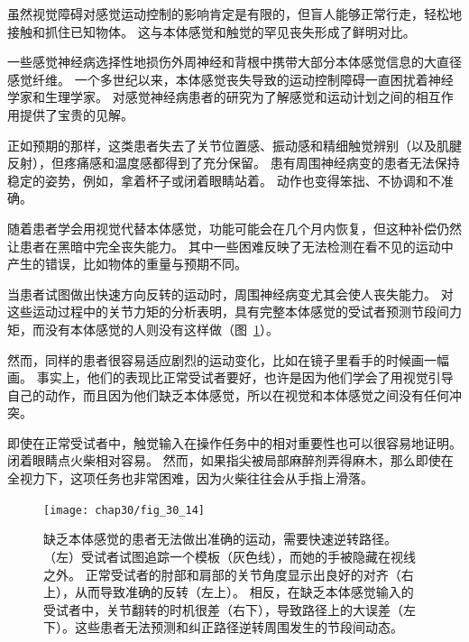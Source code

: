 \begin{proposition}[本体感觉和触觉对感觉运动控制至关重要] \label{box:30_3}
	
	\quad \quad 虽然视觉障碍对感觉运动控制的影响肯定是有限的，但盲人能够正常行走，轻松地接触和抓住已知物体。
	这与本体感觉和触觉的罕见丧失形成了鲜明对比。
	
	\quad \quad 一些感觉神经病选择性地损伤外周神经和背根中携带大部分本体感觉信息的大直径感觉纤维。
	一个多世纪以来，本体感觉丧失导致的运动控制障碍一直困扰着神经学家和生理学家。
	对感觉神经病患者的研究为了解感觉和运动计划之间的相互作用提供了宝贵的见解。
	
	\quad \quad 正如预期的那样，这类患者失去了关节位置感、振动感和精细触觉辨别（以及肌腱反射），但疼痛感和温度感都得到了充分保留。
	患有周围神经病变的患者无法保持稳定的姿势，例如，拿着杯子或闭着眼睛站着。
	动作也变得笨拙、不协调和不准确。
	
	\quad \quad 随着患者学会用视觉代替本体感觉，功能可能会在几个月内恢复，但这种补偿仍然让患者在黑暗中完全丧失能力。
	其中一些困难反映了无法检测在看不见的运动中产生的错误，比如物体的重量与预期不同。
	
	\quad \quad 当患者试图做出快速方向反转的运动时，周围神经病变尤其会使人丧失能力。
	对这些运动过程中的关节力矩的分析表明，具有完整本体感觉的受试者预测节段间力矩，而没有本体感觉的人则没有这样做（图~\ref{fig:30_14}）。
	
	\quad \quad 然而，同样的患者很容易适应剧烈的运动变化，比如在镜子里看手的时候画一幅画。
	事实上，他们的表现比正常受试者要好，也许是因为他们学会了用视觉引导自己的动作，而且因为他们缺乏本体感觉，所以在视觉和本体感觉之间没有任何冲突。
	
	\quad \quad 即使在正常受试者中，触觉输入在操作任务中的相对重要性也可以很容易地证明。
	闭着眼睛点火柴相对容易。
	然而，如果指尖被局部麻醉剂弄得麻木，那么即使在全视力下，这项任务也非常困难，因为火柴往往会从手指上滑落。
	
\end{proposition}


\begin{figure}[htbp]
	\centering
	\texttt{[image: chap30/fig\_30\_14]}
	\caption{缺乏本体感觉的患者无法做出准确的运动，需要快速逆转路径。
		（左）受试者试图追踪一个模板（灰色线），而她的手被隐藏在视线之外。
		正常受试者的肘部和肩部的关节角度显示出良好的对齐（右上），从而导致准确的反转（左上）。
		相反，在缺乏本体感觉输入的受试者中，关节翻转的时机很差（右下），导致路径上的大误差（左下）。这些患者无法预测和纠正路径逆转周围发生的节段间动态。}
	\label{fig:30_14}
\end{figure}


